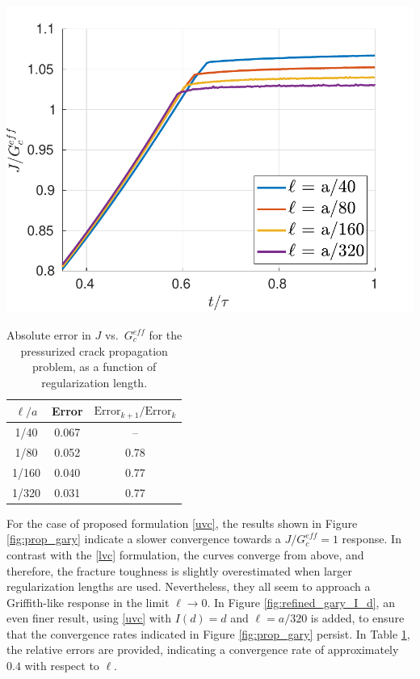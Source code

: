 \begin{table}[ht]
  \begin{minipage}[b]{0.6\linewidth}
      \centering
      \includegraphics[width=\linewidth]{images/2d_propagation/zoom_fine_gary_I_d.pdf}
      \label{fig:refined_gary_I_d}
  \end{minipage}
  \begin{minipage}[b]{0.35\linewidth}
    \centering
    \begin{tabular}{ccc}
    \hline
    $\ell/a$ &Error &$\text{Error}_{k+1}/\text{Error}_{k}$ \\
    \hline
    1/40  & 0.067 & --\\
    1/80  & 0.052 & 0.78\\
    1/160 & 0.040 & 0.77\\
    1/320 & 0.031 & 0.77\\
    \hline
    \end{tabular}
    \vspace{3cm}
    \caption{Absolute error in $J$ vs.\ $G_c^{eff}$ for the pressurized crack propagation problem, as a function of regularization length.}
    \label{table:convergence_check}
  \end{minipage}
\end{table}



For the case of proposed formulation \eqref{uvc}, the results shown in Figure \ref{fig:prop_gary} indicate a slower convergence towards a 
$J/G^{eff}_c = 1$ response. In contrast with the \eqref{lvc} formulation, the curves converge from above, and therefore, the fracture toughness is slightly overestimated when larger regularization lengths are used. Nevertheless, they all seem to approach a Griffith-like response in the limit $\ell \rightarrow 0$. In Figure \ref{fig:refined_gary_I_d}, an even finer result, using \eqref{uvc} with $I(d)=d$ and $\ell = a/320$ is added, to ensure that the convergence rates indicated in Figure \ref{fig:prop_gary} persist. In Table \ref{table:convergence_check}, the relative errors are provided, indicating a convergence rate of approximately $0.4$ with respect to $\ell$.

